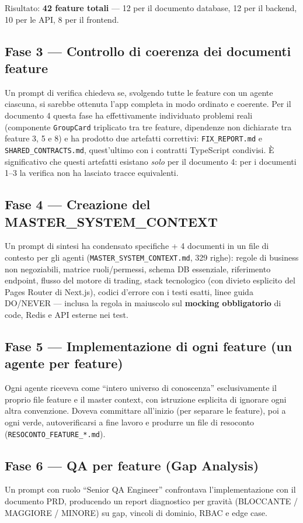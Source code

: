 \documentclass[11pt,a4paper]{article}
\newcommand{\file}[1]{\texttt{\small #1}}
\begin{document}
Risultato: \textbf{42 feature totali} --- 12 per il documento database, 12 per il backend, 10 per le API, 8 per il frontend.

\subsection{Fase 3 --- Controllo di coerenza dei documenti feature}
Un prompt di verifica chiedeva se, svolgendo tutte le feature con un agente ciascuna, si sarebbe ottenuta l'app completa in modo ordinato e coerente. Per il documento 4 questa fase ha effettivamente individuato problemi reali (componente \file{GroupCard} triplicato tra tre feature, dipendenze non dichiarate tra feature 3, 5 e 8) e ha prodotto due artefatti correttivi: \file{FIX\_REPORT.md} e \file{SHARED\_CONTRACTS.md}, quest'ultimo con i contratti TypeScript condivisi. \`E significativo che questi artefatti esistano \emph{solo} per il documento 4: per i documenti 1--3 la verifica non ha lasciato tracce equivalenti.

\subsection{Fase 4 --- Creazione del MASTER\_SYSTEM\_CONTEXT}
Un prompt di sintesi ha condensato specifiche + 4 documenti in un file di contesto per gli agenti (\file{MASTER\_SYSTEM\_CONTEXT.md}, 329 righe): regole di business non negoziabili, matrice ruoli/permessi, schema DB essenziale, riferimento endpoint, flusso del motore di trading, stack tecnologico (con divieto esplicito del Pages Router di Next.js), codici d'errore con i testi esatti, linee guida DO/NEVER --- inclusa la regola in maiuscolo sul \textbf{mocking obbligatorio} di code, Redis e API esterne nei test.

\subsection{Fase 5 --- Implementazione di ogni feature (un agente per feature)}
Ogni agente riceveva come ``intero universo di conoscenza'' esclusivamente il proprio file feature e il master context, con istruzione esplicita di ignorare ogni altra convenzione. Doveva committare all'inizio (per separare le feature), poi a ogni verde, autoverificarsi a fine lavoro e produrre un file di resoconto (\file{RESOCONTO\_FEATURE\_*.md}).

\subsection{Fase 6 --- QA per feature (Gap Analysis)}
Un prompt con ruolo ``Senior QA Engineer'' confrontava l'implementazione con il documento PRD, producendo un report diagnostico per gravit\`a (BLOCCANTE / MAGGIORE / MINORE) su gap, vincoli di dominio, RBAC e edge case.
\end{document}
